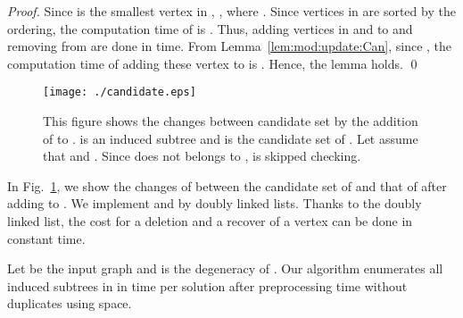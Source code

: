 \documentclass{llncs}
\begin{document}
\begin{proof}
    Since  is the smallest vertex in , 
    , 
    where . 
    Since vertices in  are sorted by the ordering, 
    the computation time of  is . 
    Thus, 
    adding vertices in  and  to  
    and removing  from  are done in  time. 
From Lemma~\ref{lem:mod:update:Can}, 
    since , 
    the computation time of adding these vertex to  is . 
Hence, the lemma holds. 
    \qed 
\end{proof}



\begin{figure}[t]
    \begin{center}
        \texttt{[image: ./candidate.eps]}
        \caption{
            This figure shows the changes between candidate set  
            by the addition of  to . 
             is an induced subtree and 
             is the candidate set of . 
            Let assume that  and . 
            Since  does not belongs to , 
             is skipped checking. 
        }
        \label{img:candidate}
    \end{center}
\end{figure}


In Fig.~\ref{img:candidate}, 
we show the changes of between 
the candidate set of  and that of  
after adding  to . 
We implement  and   by doubly linked lists. 
Thanks to the doubly linked list, 
the cost for a deletion and a recover of a vertex 
can be done in constant time. 


\begin{theorem}
    \label{thm:complexity}
    Let  be the input graph and  is the degeneracy of . 
    Our algorithm enumerates all induced subtrees in  
    in  time per solution 
    after  preprocessing time without duplicates 
    using  space. 
\end{theorem}
\end{document}
